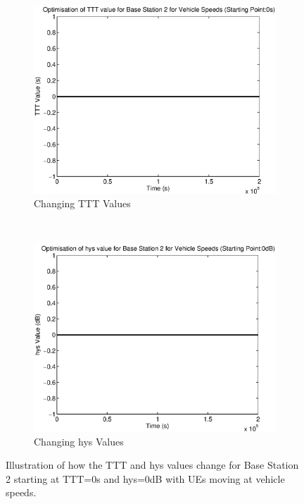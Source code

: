 \begin{figure}[H]
        \centering
        \begin{subfigure}[b]{0.49\textwidth}
                \includegraphics[width=\textwidth]{figures/graphs/vehlow/TTT2.eps}
                \caption{Changing TTT Values}
        \end{subfigure}%
        ~ %
        \begin{subfigure}[b]{0.49\textwidth}
                \includegraphics[width=\textwidth]{figures/graphs/vehlow/hys2.eps}
                \caption{Changing hys Values}
        \end{subfigure}
        \caption{Illustration of how the TTT and hys values change for Base Station 2 starting at TTT=0s and hys=0dB with UEs moving at vehicle speeds.}
\end{figure}

